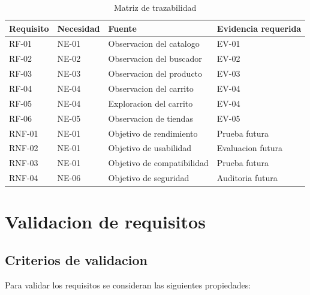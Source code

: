 \documentclass[11pt,a4paper]{article}
\begin{document}
\begin{table}[H]
\centering
\caption{Matriz de trazabilidad}
\small
\begin{tabularx}{\textwidth}{p{2cm}p{2cm}p{3cm}Y}
\toprule
\textbf{Requisito} &
\textbf{Necesidad} &
\textbf{Fuente} &
\textbf{Evidencia requerida} \\
\midrule

RF-01 &
NE-01 &
Observacion del catalogo &
EV-01 \\

RF-02 &
NE-02 &
Observacion del buscador &
EV-02 \\

RF-03 &
NE-03 &
Observacion del producto &
EV-03 \\

RF-04 &
NE-04 &
Observacion del carrito &
EV-04 \\

RF-05 &
NE-04 &
Exploracion del carrito &
EV-04 \\

RF-06 &
NE-05 &
Observacion de tiendas &
EV-05 \\

RNF-01 &
NE-01 &
Objetivo de rendimiento &
Prueba futura \\

RNF-02 &
NE-01 &
Objetivo de usabilidad &
Evaluacion futura \\

RNF-03 &
NE-01 &
Objetivo de compatibilidad &
Prueba futura \\

RNF-04 &
NE-06 &
Objetivo de seguridad &
Auditoria futura \\

\bottomrule
\end{tabularx}
\end{table}

\section{Validacion de requisitos}

\subsection{Criterios de validacion}

Para validar los requisitos se consideran
las siguientes propiedades:
\end{document}
